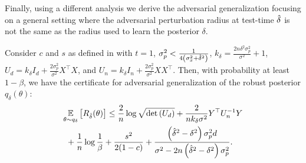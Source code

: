 Finally, using a different analysis we derive the adversarial generalization focusing on a general setting where the adversarial  perturbation radius at test-time $\hat{\delta}$ is not the same as the radius used to learn the posterior $\delta$.
\begin{theorem} \label{thm:adv_post_adv_loss_gen}
Consider $c$ and $s$ as defined in  with $t=1$, $\sigma_p^2 < \frac{1}{4 \left( \sigma_x^2 + \hat{\delta}^2\right)}$,
$k_\delta = \frac{2n\delta^2\sigma_p^2}{\sigma^2} + 1$, 
$U_d= k_\delta I_d + \frac{2\sigma_p^2}{\sigma^2} X^\top X$, and $U_n= k_\delta I_n + \frac{2\sigma_p^2}{\sigma^2} XX^\top$. Then, with probability at least $1-\beta$, we have the certificate for adversarial generalization of the robust posterior $  {q}_\delta(\theta)$: 
\begin{align}
&\underset{  \theta \sim {q}_\delta}{\mathbb{E}}\left[  {R}_{\hat{\delta}}(\theta)\right] \leq \frac{2}{n} \log \sqrt{\det \left( U_d \right)} + \frac{2}{n k_\delta \sigma^2} Y^\top U_n^{-1} Y  \nonumber \\
&\,\, + \frac{1}{n} \log \frac{1}{\beta}  +\frac{s^2}{2(1-c)} + \frac{\left( \hat{\delta}^2 -\delta^2 \right) \sigma_p^2 d}{\sigma^2-2n\left( \hat{\delta}^2 -\delta^2 \right) \sigma_p^2}.
\label{eq:pac_bayes_adv_post_adv_loss_gen}
\end{align}
\end{theorem}


